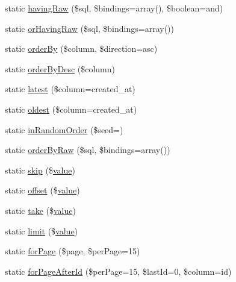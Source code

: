 \begin{DoxyCompactItemize}
\item 
static \mbox{\hyperlink{class_eloquent_a756265cf9b44ab3d9d63a5364763d9f2}{having\+Raw}} (\$sql, \$bindings=array(), \$boolean=\textquotesingle{}and\textquotesingle{})
\item 
static \mbox{\hyperlink{class_eloquent_a6fac6b159c4a57120d5a6ac77cbca16c}{or\+Having\+Raw}} (\$sql, \$bindings=array())
\item 
static \mbox{\hyperlink{class_eloquent_a892149342bab8cc0e624dd009c0aaa01}{order\+By}} (\$column, \$direction=\textquotesingle{}asc\textquotesingle{})
\item 
static \mbox{\hyperlink{class_eloquent_af93c2d362571fd37e1e7cf33aa627a0a}{order\+By\+Desc}} (\$column)
\item 
static \mbox{\hyperlink{class_eloquent_a6ece4c9b56f9334272522c306f283a2f}{latest}} (\$column=\textquotesingle{}created\+\_\+at\textquotesingle{})
\item 
static \mbox{\hyperlink{class_eloquent_a3a6232dc598b629da754e20f19a02a81}{oldest}} (\$column=\textquotesingle{}created\+\_\+at\textquotesingle{})
\item 
static \mbox{\hyperlink{class_eloquent_a75919dc1a77ec126c2188aa97c890b45}{in\+Random\+Order}} (\$seed=\textquotesingle{}\textquotesingle{})
\item 
static \mbox{\hyperlink{class_eloquent_a817e3e9e4221b1bb88b1c5bc57e18c3c}{order\+By\+Raw}} (\$sql, \$bindings=array())
\item 
static \mbox{\hyperlink{class_eloquent_a2fd45cfad88ad5d4d5a2a77920cabfcf}{skip}} (\$\mbox{\hyperlink{class_eloquent_a653061eb837042f61e82447886e15a72}{value}})
\item 
static \mbox{\hyperlink{class_eloquent_ab8f792a4282a6d9fb5897ef7eb066dda}{offset}} (\$\mbox{\hyperlink{class_eloquent_a653061eb837042f61e82447886e15a72}{value}})
\item 
static \mbox{\hyperlink{class_eloquent_ae3c0357543a8e9d871ca61bf64109793}{take}} (\$\mbox{\hyperlink{class_eloquent_a653061eb837042f61e82447886e15a72}{value}})
\item 
static \mbox{\hyperlink{class_eloquent_a4c6d298be10cf541f36b4c50311cd8cc}{limit}} (\$\mbox{\hyperlink{class_eloquent_a653061eb837042f61e82447886e15a72}{value}})
\item 
static \mbox{\hyperlink{class_eloquent_a6bcc6951a0901e619a303e777ec1d971}{for\+Page}} (\$page, \$per\+Page=15)
\item 
static \mbox{\hyperlink{class_eloquent_ac7f037ea162597f9d44b8e9010e60c77}{for\+Page\+After\+Id}} (\$per\+Page=15, \$last\+Id=0, \$column=\textquotesingle{}id\textquotesingle{})

\end{DoxyCompactItemize}
